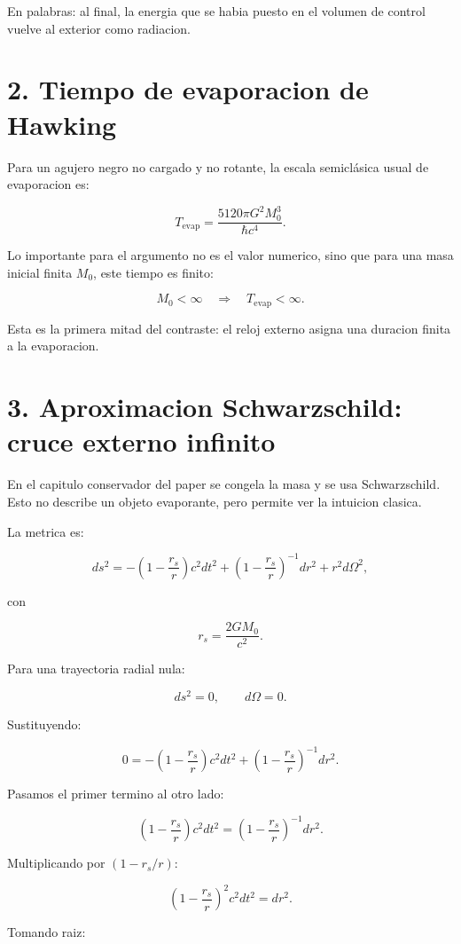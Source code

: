 ﻿\documentclass[11pt,a4paper]{article}
\begin{document}
En palabras: al final, la energia que se habia puesto en el volumen de control vuelve al exterior como radiacion.

\section{2. Tiempo de evaporacion de Hawking}

Para un agujero negro no cargado y no rotante, la escala semiclásica usual de evaporacion es:

\[
T_{\mathrm{evap}}
=
\frac{5120\pi G^2 M_0^3}{\hbar c^4}.
\]

Lo importante para el argumento no es el valor numerico, sino que para una masa inicial finita \(M_0\), este tiempo es finito:

\[
M_0<\infty
\quad\Longrightarrow\quad
T_{\mathrm{evap}}<\infty.
\]

Esta es la primera mitad del contraste: el reloj externo asigna una duracion finita a la evaporacion.

\section{3. Aproximacion Schwarzschild: cruce externo infinito}

En el capitulo conservador del paper se congela la masa y se usa Schwarzschild. Esto no describe un objeto evaporante, pero permite ver la intuicion clasica.

La metrica es:

\[
ds^2
=
-
\left(1-\frac{r_s}{r}\right)c^2dt^2
+
\left(1-\frac{r_s}{r}\right)^{-1}dr^2
+
r^2d\Omega^2,
\]

con

\[
r_s=\frac{2GM_0}{c^2}.
\]

Para una trayectoria radial nula:

\[
ds^2=0,
\qquad
d\Omega=0.
\]

Sustituyendo:

\[
0
=
-
\left(1-\frac{r_s}{r}\right)c^2dt^2
+
\left(1-\frac{r_s}{r}\right)^{-1}dr^2.
\]

Pasamos el primer termino al otro lado:

\[
\left(1-\frac{r_s}{r}\right)c^2dt^2
=
\left(1-\frac{r_s}{r}\right)^{-1}dr^2.
\]

Multiplicando por \(\left(1-r_s/r\right)\):

\[
\left(1-\frac{r_s}{r}\right)^2 c^2dt^2
=
dr^2.
\]

Tomando raiz:
\end{document}
